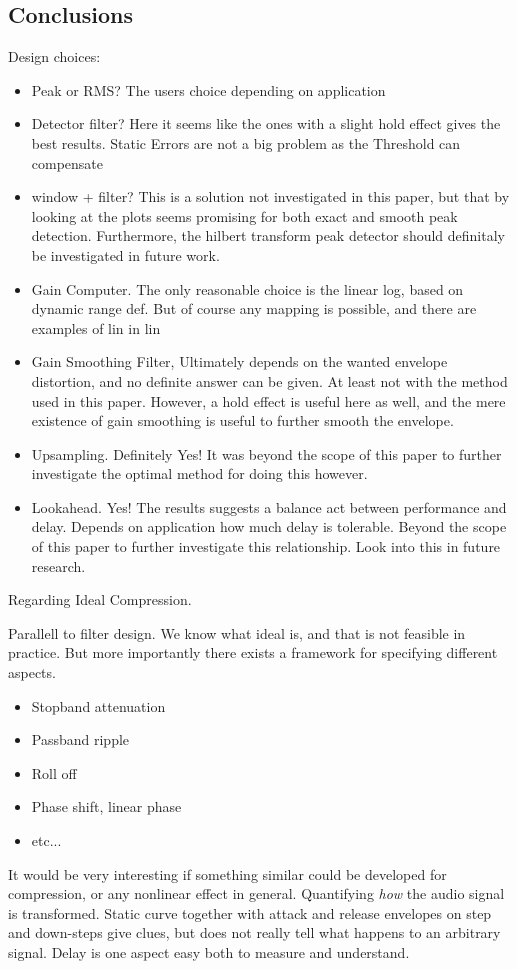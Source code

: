 \documentclass[../main2.tex]{subfiles}
\begin{document}
\subsection{Conclusions}\label{discussion_results}

Design choices:
\begin{itemize}
\item Peak or RMS? The users choice depending on application
\item Detector filter? Here it seems like the ones with a slight hold effect gives the best results. Static Errors are not a big problem as the Threshold can compensate
\item window + filter? This is a solution not investigated in this paper, but that by looking at the plots seems promising for both exact and smooth peak detection. Furthermore, the hilbert transform peak detector should definitaly be investigated in future work.
\item Gain Computer. The only reasonable choice is the linear log, based on dynamic range def. But of course any mapping is possible, and there are examples of lin in lin
\item Gain Smoothing Filter, Ultimately depends on the wanted envelope distortion, and no definite answer can be given. At least not with the method used in this paper. However, a hold effect is useful here as well, and the mere existence of gain smoothing is useful to further smooth the envelope.
\item Upsampling. Definitely Yes! It was beyond the scope of this paper to further investigate the optimal method for doing this however.
\item Lookahead. Yes! The results suggests a balance act between performance and delay. Depends on application how much delay is tolerable. Beyond the scope of this paper to further investigate this relationship. Look into this in future research.
\end{itemize}

Regarding Ideal Compression. 

Parallell to filter design. We know what ideal is, and that is not feasible in practice. But more importantly there exists a framework for specifying different aspects.
\begin{itemize} 
\item Stopband attenuation
\item Passband ripple
\item Roll off
\item Phase shift, linear phase
\item etc...
\end{itemize}
It would be very interesting if something similar could be developed for compression, or any nonlinear effect in general. Quantifying \emph{how} the audio signal is transformed. Static curve together with attack and release envelopes on step and down-steps give clues, but does not really tell what happens to an arbitrary signal. Delay is one aspect easy both to measure and understand.
\end{document}
